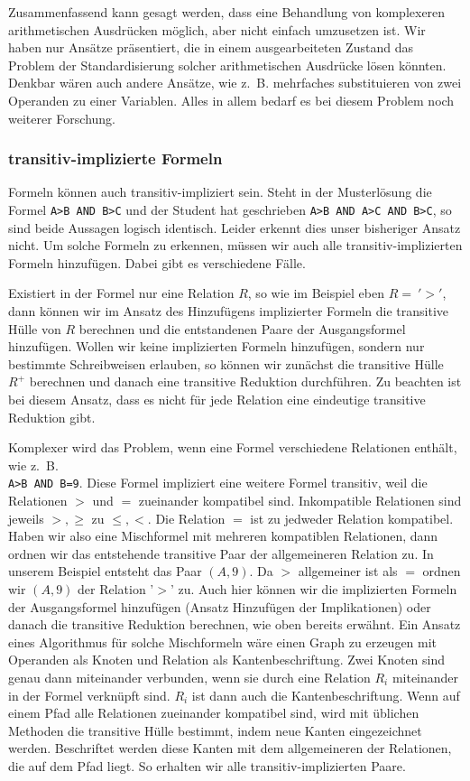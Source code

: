 Zusammenfassend kann gesagt werden, dass eine Behandlung von komplexeren arithmetischen Ausdrücken möglich, aber nicht einfach umzusetzen ist. Wir haben nur Ansätze präsentiert, die in einem ausgearbeiteten Zustand das Problem der Standardisierung solcher arithmetischen Ausdrücke lösen könnten. Denkbar wären auch andere Ansätze, wie \mbox{z. B.} mehrfaches substituieren von zwei Operanden zu einer Variablen.  Alles in allem bedarf es bei diesem Problem noch weiterer Forschung.


\subsubsection{transitiv-implizierte Formeln}

Formeln können auch transitiv-impliziert sein. Steht in der Musterlösung die Formel \verb|A>B AND B>C| und der Student hat geschrieben \verb|A>B AND A>C AND B>C|, so sind beide Aussagen logisch identisch. Leider erkennt dies unser bisheriger Ansatz nicht. Um solche Formeln zu erkennen, müssen wir auch alle transitiv-implizierten Formeln hinzufügen. Dabei gibt es verschiedene Fälle. 

Existiert in der Formel nur eine Relation $R$, so wie im Beispiel eben $R=\ '>'$, dann können wir im Ansatz des Hinzufügens implizierter Formeln die transitive Hülle von $R$ berechnen und die entstandenen Paare der Ausgangsformel hinzufügen. Wollen wir keine implizierten Formeln hinzufügen, sondern nur bestimmte Schreibweisen erlauben, so können wir zunächst die transitive Hülle $R^+$ berechnen und danach eine transitive Reduktion durchführen. Zu beachten ist bei diesem Ansatz, dass es nicht für jede Relation eine eindeutige transitive Reduktion gibt. 

Komplexer wird das Problem, wenn eine Formel verschiedene Relationen enthält, wie \mbox{z. B.} \\\verb|A>B AND B=9|. Diese Formel impliziert eine weitere Formel transitiv, weil die Relationen $>$ und $=$ zueinander kompatibel sind. Inkompatible Relationen sind jeweils $>,\geq$ zu $\leq,<$. Die Relation $=$ ist zu jedweder Relation kompatibel. Haben wir also eine Mischformel mit mehreren kompatiblen Relationen, dann ordnen wir das entstehende transitive Paar der allgemeineren Relation zu. In unserem Beispiel entsteht das Paar $(A,9)$. Da $>$ allgemeiner ist als $=$ ordnen wir $(A,9)$ der Relation '$>$' zu. Auch hier können wir die implizierten Formeln der Ausgangsformel hinzufügen (Ansatz Hinzufügen der Implikationen) oder danach die transitive Reduktion berechnen, wie oben bereits erwähnt. Ein Ansatz eines Algorithmus für solche Mischformeln wäre einen Graph zu erzeugen mit Operanden als Knoten und Relation als Kantenbeschriftung. Zwei Knoten sind genau dann miteinander verbunden, wenn sie durch eine Relation $R_i$ miteinander in der Formel verknüpft sind. $R_i$ ist dann auch die Kantenbeschriftung. Wenn auf einem Pfad alle Relationen zueinander kompatibel sind, wird mit üblichen Methoden die transitive Hülle bestimmt, indem neue Kanten eingezeichnet werden. Beschriftet werden diese Kanten mit dem allgemeineren der Relationen, die auf dem Pfad liegt. So erhalten wir alle transitiv-implizierten Paare.

